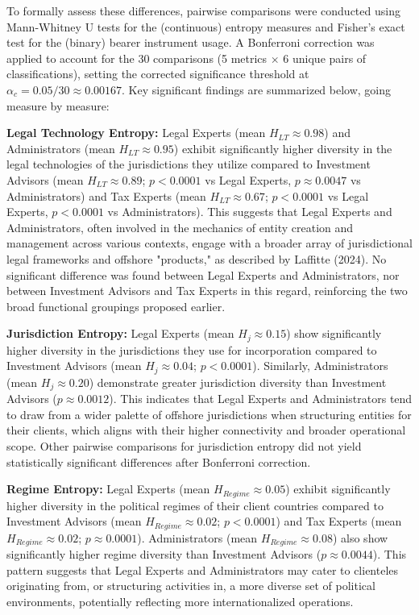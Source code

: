 To formally assess these differences, pairwise comparisons were conducted using Mann-Whitney U tests for the (continuous) entropy measures and Fisher's exact test for the (binary) bearer instrument usage. A Bonferroni correction was applied to account for the 30 comparisons (5 metrics $\times$ 6 unique pairs of classifications), setting the corrected significance threshold at $\alpha_c = 0.05/30 \approx 0.00167$. Key significant findings are summarized below, going measure by measure:

\textbf{Legal Technology Entropy:}
Legal Experts (mean $H_{LT} \approx 0.98$) and Administrators (mean $H_{LT} \approx 0.95$) exhibit significantly higher diversity in the legal technologies of the jurisdictions they utilize compared to Investment Advisors (mean $H_{LT} \approx 0.89$; $p < 0.0001$ vs Legal Experts, $p \approx 0.0047$ vs Administrators) and Tax Experts (mean $H_{LT} \approx 0.67$; $p < 0.0001$ vs Legal Experts, $p < 0.0001$ vs Administrators). This suggests that Legal Experts and Administrators, often involved in the mechanics of entity creation and management across various contexts, engage with a broader array of jurisdictional legal frameworks and offshore "products," as described by Laffitte (2024). No significant difference was found between Legal Experts and Administrators, nor between Investment Advisors and Tax Experts in this regard, reinforcing the two broad functional groupings proposed earlier.

\textbf{Jurisdiction Entropy:}
Legal Experts (mean $H_j \approx 0.15$) show significantly higher diversity in the jurisdictions they use for incorporation compared to Investment Advisors (mean $H_j \approx 0.04$; $p < 0.0001$). Similarly, Administrators (mean $H_j \approx 0.20$) demonstrate greater jurisdiction diversity than Investment Advisors ($p \approx 0.0012$). This indicates that Legal Experts and Administrators tend to draw from a wider palette of offshore jurisdictions when structuring entities for their clients, which aligns with their higher connectivity and broader operational scope. Other pairwise comparisons for jurisdiction entropy did not yield statistically significant differences after Bonferroni correction.

\textbf{Regime Entropy:}
Legal Experts (mean $H_{Regime} \approx 0.05$) exhibit significantly higher diversity in the political regimes of their client countries compared to Investment Advisors (mean $H_{Regime} \approx 0.02$; $p < 0.0001$) and Tax Experts (mean $H_{Regime} \approx 0.02$; $p \approx 0.0001$). Administrators (mean $H_{Regime} \approx 0.08$) also show significantly higher regime diversity than Investment Advisors ($p \approx 0.0044$). This pattern suggests that Legal Experts and Administrators may cater to clienteles originating from, or structuring activities in, a more diverse set of political environments, potentially reflecting more internationalized operations.

